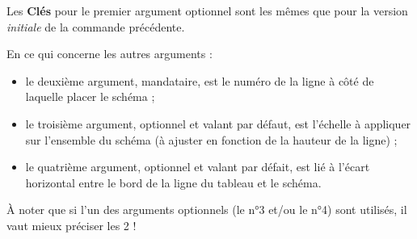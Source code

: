 \documentclass{article}
\newcommand\Cle[1]{{\bfseries\sffamily\textlangle #1\textrangle}}
\begin{document}
\begin{codetex}
\end{codetex}

\begin{codecles}
Les \Cle{Clés} pour le premier argument optionnel sont les mêmes que pour la version \textit{initiale} de la commande précédente.

En ce qui concerne les autres arguments :

\begin{itemize}
	\item le deuxième argument, mandataire, est le numéro de la ligne à côté de laquelle placer le schéma ;
	\item le troisième argument, optionnel et valant \Cle{0.85} par défaut, est l'échelle à appliquer sur l'ensemble du schéma (à ajuster en fonction de la hauteur de la ligne) ;
	\item le quatrième argument, optionnel et valant \Cle{1.5} par défait, est lié à l'écart horizontal entre le bord de la ligne du tableau et le schéma.
\end{itemize}

À noter que si l'un des arguments optionnels (le n°3 et/ou le n°4) sont utilisés, il vaut mieux préciser les 2 !
\end{codecles}

\begin{codetex}
\begin{center}
\end{center}
\end{codetex}

\begin{codesortie}
\begin{center}
\end{center}
\end{codesortie}
\end{document}
